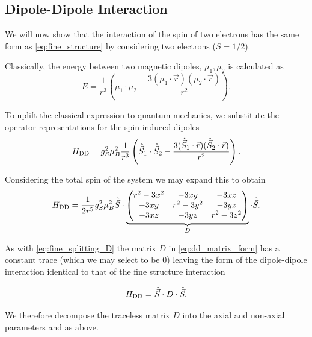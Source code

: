 \subsection{Dipole-Dipole Interaction}
We will now show that the interaction of the spin of two electrons has the same form as \eqref{eq:fine_structure} by considering two electrons ($S=1/2$). 

Classically, the energy between two magnetic dipoles, $\mu_1, \mu_2$ is calculated as
\begin{equation}
    E = \frac{1}{r^3} \left(\mu_1 \cdot \mu_2 -\frac{3(\mu_1 \cdot \vec{r})(\mu_2 \cdot \vec{r})}{r^2}\right).
\end{equation}

To uplift the classical expression to quantum mechanics, we substitute the operator representations for the spin induced dipoles 
\begin{equation}
    H_{\ce{DD}} = g_S^2 \mu_B^2 \frac{1}{r^3} \left(\hat{\vec{S}}_1 \cdot \hat{\vec{S}}_2 -\frac{3(\hat{\vec{S}}_1 \cdot \vec{r})(\hat{\vec{S}}_2 \cdot \vec{r})}{r^2}\right).
\end{equation}

Considering the total spin of the system we may expand this to obtain \cite{carrington1967introduction} 
\begin{equation}
    H_{\ce{DD}} = \frac{1}{2r^5}g_S^2 \mu_B^2 \hat{\vec{S}} \cdot
    \underbrace{
    \begin{pmatrix}
        {r^2 - 3x^2} & -3xy & - 3xz\\ 
        -3xy & r^2 - 3y^2 & -3yz \\ 
        -3xz & -3yz & r^2 - 3z^2 
    \end{pmatrix}
}_{D}
    \cdot \hat{\vec{S}}.
    \label{eq:dd_matrix_form}
\end{equation}

As with \eqref{eq:fine_splitting_D} the matrix $D$ in \eqref{eq:dd_matrix_form} has a constant trace (which we may select to be $0$) leaving the form of the dipole-dipole interaction identical to that of the fine structure interaction 

\begin{equation}
    H_{\ce{DD}} = \hat{\vec{S}} \cdot D \cdot \hat{\vec{S}}.
\end{equation}

We therefore decompose the traceless matrix $D$ into the axial and non-axial parameters  and  as above. 


